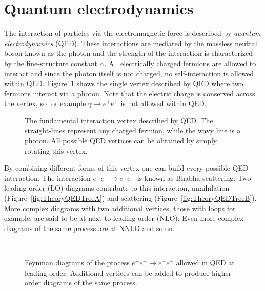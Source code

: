 \section{Quantum electrodynamics}

The interaction of particles via the electromagnetic force is described by \emph{quantum electrodynamics} (QED). These interactions are mediated by the massless neutral boson known as the photon and the strength of the interaction is characterized by the fine-structure constant $\alpha$. All electrically charged fermions are allowed to interact and since the photon itself is not charged, no self-interaction is allowed within QED\@. Figure~\ref{fig:TheorySimpleQED} shows the single vertex described by QED where two fermions interact via a photon. Note that the electric charge is conserved across the vertex, so for example $\gamma\rightarrow e^{+}e^{+}$ is not allowed within QED\@.

\begin{figure}[htbp]
  \centering
    
    \caption[The fundamental interaction vertex described by QED.]{The fundamental interaction vertex described by QED\@. The straight-lines represent any charged fermion, while the wavy line is a photon. All possible QED vertices can be obtained by simply rotating this vertex.}\label{fig:TheorySimpleQED}
\end{figure}

By combining different forms of this vertex one can build every possible QED interaction. The interaction $e^{+}e^{-}\rightarrow e^{+}e^{-}$ is known as Bhabha scattering. Two leading order (LO) diagrams contribute to this interaction, annihilation (Figure~\ref{fig:TheoryQEDTreeA}) and scattering (Figure~\ref{fig:TheoryQEDTreeB}). More complex diagrams with two additional vertices, those with loops for example, are said to be at next to leading order (NLO). Even more complex diagrams of the same process are at NNLO and so on.

\begin{figure}[htbp]
  \centering
    \begin{minipage}[][][t]{.47\textwidth}
      \centering
        
        \label{fig:TheoryQEDTreeA}
    \end{minipage}
    \,
    \begin{minipage}[][][t]{.47\textwidth}
      \centering
        
        \label{fig:TheoryQEDTreeB}
    \end{minipage}
    \caption[Feynman diagrams of the process $e^{+}e^{-}\rightarrow e^{+}e^{-}$ allowed in QED at leading order.]{Feynman diagrams of the process $e^{+}e^{-}\rightarrow e^{+}e^{-}$ allowed in QED at leading order. Additional vertices can be added to produce higher-order diagrams of the same process.}\label{fig:TheoryQEDTree}
\end{figure}

